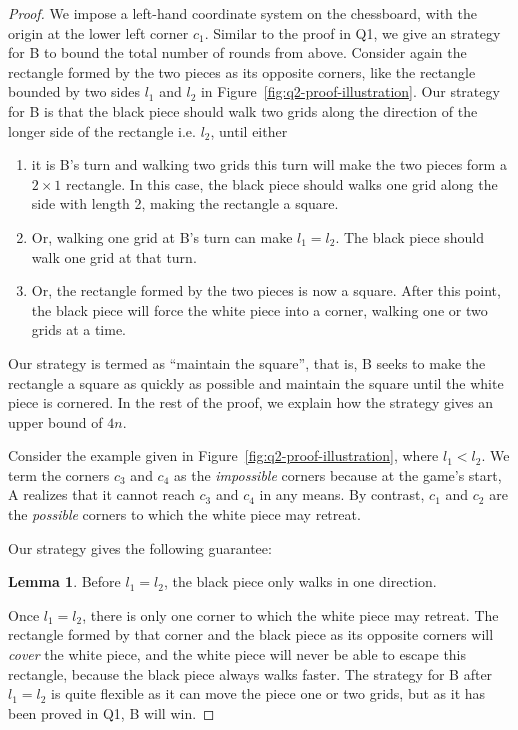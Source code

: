 \documentclass[a4paper]{article}
\theoremstyle{definition}
\newtheorem{lemma}{Lemma}
\begin{document}
\begin{proof}
    We impose a left-hand coordinate system on the chessboard, with the origin
    at the lower left corner $c_1$. Similar to the proof in Q1, we give an
    strategy for B to bound the total number of rounds from above. Consider
    again the rectangle formed by the two pieces as its opposite corners, like
    the rectangle bounded by two sides $l_1$ and $l_2$ in
    Figure~\ref{fig:q2-proof-illustration}. Our strategy for B is that the black
    piece should walk two grids along the direction of the longer side of the
    rectangle i.e. $l_2$, until either
    \begin{enumerate}
        \item it is B's turn and walking two grids this turn will make the two
        pieces form a $2 \times 1$ rectangle. In this case, the black piece
        should walks one grid along the side with length 2, making the rectangle
        a square.
        \item Or, walking one grid at B's turn can make $l_1 = l_2$. The black
        piece should walk one grid at that turn.
        \item Or, the rectangle formed by the two pieces is now a square. After
        this point, the black piece will force the white piece into a corner,
        walking one or two grids at a time.
    \end{enumerate}

    Our strategy is termed as ``maintain the square'', that is, B seeks to make
    the rectangle a square as quickly as possible and maintain the square until
    the white piece is cornered. In the rest of the proof, we explain how the
    strategy gives an upper bound of $4n$.

    Consider the example given in Figure~\ref{fig:q2-proof-illustration}, where
    $l_1 < l_2$. We term the corners $c_3$ and $c_4$ as the \emph{impossible}
    corners because at the game's start, A realizes that it cannot reach $c_3$
    and $c_4$ in any means. By contrast, $c_1$ and $c_2$ are the \emph{possible}
    corners to which the white piece may retreat.

    Our strategy gives the following guarantee:
    \begin{lemma}
        Before $l_1 = l_2$, the black piece only walks in one direction.
    \end{lemma}

    Once $l_1 = l_2$, there is only one corner to which the white piece may
    retreat. The rectangle formed by that corner and the black piece as its
    opposite corners will \emph{cover} the white piece, and the white piece will
    never be able to escape this rectangle, because the black piece always walks
    faster. The strategy for B after $l_1 = l_2$ is quite flexible as it can
    move the piece one or two grids, but as it has been proved in Q1, B will
    win.


\end{proof}
\end{document}
